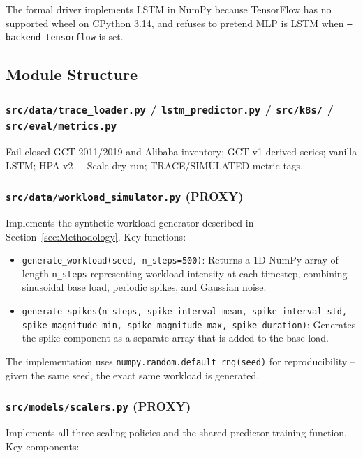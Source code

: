 The formal driver implements LSTM in NumPy because TensorFlow has no supported wheel on CPython 3.14, and refuses to pretend MLP is LSTM when \texttt{--backend tensorflow} is set.

\subsection{Module Structure}

\subsubsection{\texttt{src/data/trace\_loader.py} / \texttt{lstm\_predictor.py} / \texttt{src/k8s/} / \texttt{src/eval/metrics.py}}
Fail-closed GCT 2011/2019 and Alibaba inventory; GCT v1 derived series; vanilla LSTM; HPA v2 + Scale dry-run; TRACE/SIMULATED metric tags.

\subsubsection{\texttt{src/data/workload\_simulator.py} (PROXY)}

Implements the synthetic workload generator described in Section~\ref{sec:Methodology}. Key functions:

\begin{itemize}
  \item \texttt{generate\_workload(seed, n\_steps=500)}: Returns a 1D NumPy array of length \texttt{n\_steps} representing workload intensity at each timestep, combining sinusoidal base load, periodic spikes, and Gaussian noise.
  \item \texttt{generate\_spikes(n\_steps, spike\_interval\_mean, spike\_interval\_std, spike\_magnitude\_min, spike\_magnitude\_max, spike\_duration)}: Generates the spike component as a separate array that is added to the base load.
\end{itemize}

The implementation uses \texttt{numpy.random.default\_rng(seed)} for reproducibility -- given the same seed, the exact same workload is generated.

\subsubsection{\texttt{src/models/scalers.py} (PROXY)}

Implements all three scaling policies and the shared predictor training function. Key components:

